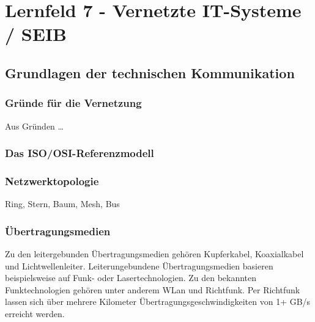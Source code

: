 \section{Lernfeld 7 - Vernetzte IT-Systeme / SEIB} %

\subsection{Grundlagen der technischen Kommunikation}
\subsubsection{Gründe für die Vernetzung}

Aus Gründen \dots

\subsubsection{Das ISO/OSI-Referenzmodell}
\subsubsection{Netzwerktopologie}

Ring, Stern, Baum, Mesh, Bus

\subsubsection{Übertragungsmedien}

Zu den leitergebunden Übertragungsmedien gehören Kupferkabel, Koaxialkabel und Lichtwellenleiter. Leiterungebundene Übertragungsmedien basieren beispielsweise auf Funk- oder Lasertechnologien. Zu den bekannten Funktechnologien gehören unter anderem WLan und Richtfunk. Per Richtfunk lassen sich über mehrere Kilometer Übertragungsgeschwindigkeiten von 1+ GB/s erreicht werden.

